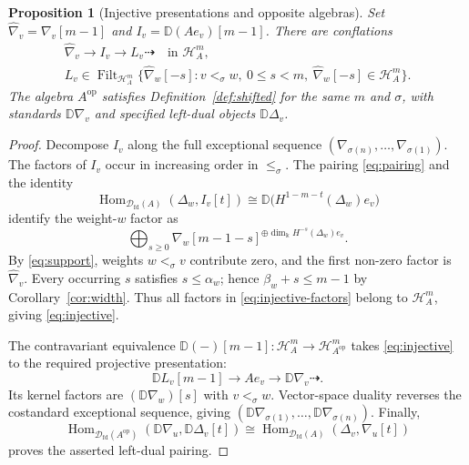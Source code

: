 \documentclass[11pt,a4paper]{article}
\newcommand{\D}{\mathcal D}
\renewcommand{\H}{\mathcal H}
\newcommand{\op}{\mathrm{op}}
\newcommand{\std}{\Delta}
\newcommand{\costd}{\nabla}
\newcommand{\dual}{\mathbb D}
\DeclareMathOperator{\fd}{fd}
\DeclareMathOperator{\Hom}{Hom}
\DeclareMathOperator{\Filt}{Filt}
\theoremstyle{plain}
\newtheorem{proposition}[theorem]{Proposition}
\theoremstyle{definition}
\numberwithin{equation}{section}
\begin{document}
\begin{proposition}[Injective presentations and opposite algebras]
\label{prop:injectives}
Set $\widehat{\costd}_v=\costd_v[m-1]$ and
$I_v=\dual(Ae_v)[m-1]$. There are conflations
\begin{equation}\label{eq:injective}
 \begin{gathered}
 \widehat{\costd}_v\longrightarrow I_v\longrightarrow L_v
 \dashrightarrow\quad\text{in }\H_A^m,\\
 L_v\in\Filt_{\H_A^m}
 \{\widehat{\costd}_w[-s]:v<_\sigma w,\ 0\leq s<m,\
                         \widehat{\costd}_w[-s]\in\H_A^m\}.
 \end{gathered}
\end{equation}
The algebra $A^{\op}$ satisfies Definition~\ref{def:shifted} for the
same $m$ and $\sigma$, with standards $\dual\costd_v$ and specified
left-dual objects $\dual\std_v$.
\end{proposition}
\begin{proof}
Decompose $I_v$ along the full exceptional sequence
$(\costd_{\sigma(n)},\ldots,\costd_{\sigma(1)})$.
The factors of $I_v$ occur in increasing order in $\leq_\sigma$.
The pairing \eqref{eq:pairing} and the identity
\[
 \Hom_{\D_{\fd}(A)}(\std_w,I_v[t])
 \cong\dual\bigl(H^{1-m-t}(\std_w)e_v\bigr)
\]
identify the weight-$w$ factor as
\begin{equation}\label{eq:injective-factors}
 \bigoplus_{s\geq0}
 \costd_w[m-1-s]^{\oplus\dim_{\Bbbk}H^{-s}(\std_w)e_v}.
\end{equation}
By \eqref{eq:support}, weights $w<_\sigma v$ contribute zero, and
the first non-zero factor is $\widehat{\costd}_v$.
Every occurring $s$ satisfies $s\leq\alpha_w$; hence
$\beta_w+s\leq m-1$ by Corollary~\ref{cor:width}.
Thus all factors in \eqref{eq:injective-factors} belong to $\H_A^m$,
giving \eqref{eq:injective}.

The contravariant equivalence
$\dual(-)[m-1]:\H_A^m\to\H_{A^{\op}}^m$
takes \eqref{eq:injective} to the required projective presentation:
\[
 \dual L_v[m-1]\longrightarrow Ae_v
 \longrightarrow\dual\costd_v\dashrightarrow.
\]
Its kernel factors are $(\dual\costd_w)[s]$ with $v<_\sigma w$.
Vector-space duality reverses the costandard exceptional sequence,
giving $(\dual\costd_{\sigma(1)},\ldots,\dual\costd_{\sigma(n)})$.
Finally,
\[
 \Hom_{\D_{\fd}(A^{\op})}(\dual\costd_u,\dual\std_v[t])
 \cong\Hom_{\D_{\fd}(A)}(\std_v,\costd_u[t])
\]
proves the asserted left-dual pairing.
\end{proof}
\end{document}

